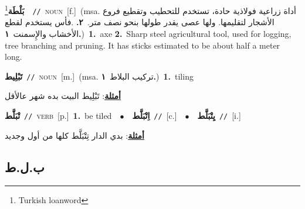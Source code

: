 \documentclass[10pt,a4paper,twoside]{article} %
\begin{document}
\begin{multicols}{2}
{\setlength\topsep{0pt}\textbf{\foreignlanguage{arabic}{بَلْطَة}}\footnote{Turkish loanword}\ \ {\color{gray}\texttt{//}\color{black}}\ \textsc{noun}\ [f.]\ \color{gray}(msa. \foreignlanguage{arabic}{أداة زراعية فولاذية حادة، تستخدم للتحطيب وتقطيع فروع الأشجار لتقليمها. ولها عصى يقدر طولها بنحو نصف متر.}~\foreignlanguage{arabic}{\textbf{٢.}}  .\foreignlanguage{arabic}{فأس يستخدم لقطع الأخشاب والإِسمنت}~\foreignlanguage{arabic}{\textbf{١.}})\color{black}\ \textbf{1.}~axe  \textbf{2.}~Sharp steel agricultural tool, used for logging, tree branching and pruning. It has sticks estimated to be about half a meter long.\ } \vspace{2mm}

{\setlength\topsep{0pt}\textbf{\foreignlanguage{arabic}{تَبْلِيط}}\ {\color{gray}\texttt{//}\color{black}}\ \textsc{noun}\ [m.]\ \color{gray}(msa. \foreignlanguage{arabic}{تركيب البلاط}~\foreignlanguage{arabic}{\textbf{١.}})\color{black}\ \textbf{1.}~tiling\  \begin{flushright}\color{gray}\foreignlanguage{arabic}{\textbf{\underline{\foreignlanguage{arabic}{أمثلة}}}: تَبْلِيط البيت بده شهر عالأقل}\end{flushright}\color{black}} \vspace{2mm}

{\setlength\topsep{0pt}\textbf{\foreignlanguage{arabic}{تْبَلَّط}}\ {\color{gray}\texttt{//}\color{black}}\ \textsc{verb}\ [p.]\ \textbf{1.}~be tiled\ \ $\bullet$\ \ \setlength\topsep{0pt}\textbf{\foreignlanguage{arabic}{اِتْبَلَّط}}\ {\color{gray}\texttt{//}\color{black}}\ [c.]\ \ $\bullet$\ \ \setlength\topsep{0pt}\textbf{\foreignlanguage{arabic}{يِتْبَلَّط}}\ {\color{gray}\texttt{//}\color{black}}\ [i.]\  \begin{flushright}\color{gray}\foreignlanguage{arabic}{\textbf{\underline{\foreignlanguage{arabic}{أمثلة}}}: بدي الدار تِتْبَلَّط كلها من أول وجديد}\end{flushright}\color{black}} \vspace{2mm}

\vspace{-3mm}
\subsection*{\color{blue}\foreignlanguage{arabic}{ب.ل.ط}\color{blue}{ (ntws)}} 


\end{multicols}
\end{document}
